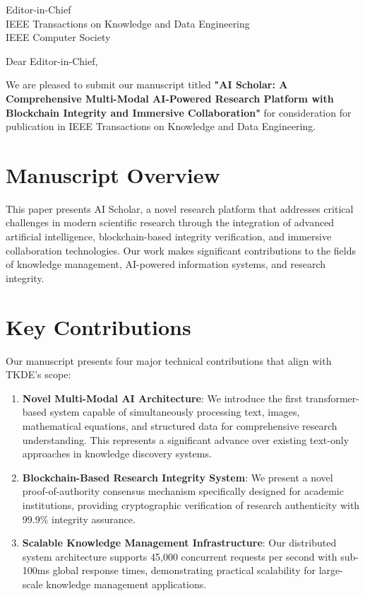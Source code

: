 \documentclass[11pt]{letter}
\begin{document}
\begin{letter}{Editor-in-Chief\\
IEEE Transactions on Knowledge and Data Engineering\\
IEEE Computer Society}

\opening{Dear Editor-in-Chief,}

We are pleased to submit our manuscript titled \textbf{"AI Scholar: A Comprehensive Multi-Modal AI-Powered Research Platform with Blockchain Integrity and Immersive Collaboration"} for consideration for publication in IEEE Transactions on Knowledge and Data Engineering.

\section*{Manuscript Overview}

This paper presents AI Scholar, a novel research platform that addresses critical challenges in modern scientific research through the integration of advanced artificial intelligence, blockchain-based integrity verification, and immersive collaboration technologies. Our work makes significant contributions to the fields of knowledge management, AI-powered information systems, and research integrity.

\section*{Key Contributions}

Our manuscript presents four major technical contributions that align with TKDE's scope:

\begin{enumerate}
    \item \textbf{Novel Multi-Modal AI Architecture}: We introduce the first transformer-based system capable of simultaneously processing text, images, mathematical equations, and structured data for comprehensive research understanding. This represents a significant advance over existing text-only approaches in knowledge discovery systems.
    
    \item \textbf{Blockchain-Based Research Integrity System}: We present a novel proof-of-authority consensus mechanism specifically designed for academic institutions, providing cryptographic verification of research authenticity with 99.9\% integrity assurance.
    
    \item \textbf{Scalable Knowledge Management Infrastructure}: Our distributed system architecture supports 45,000 concurrent requests per second with sub-100ms global response times, demonstrating practical scalability for large-scale knowledge management applications.
    

\end{enumerate}
\end{letter}
\end{document}
